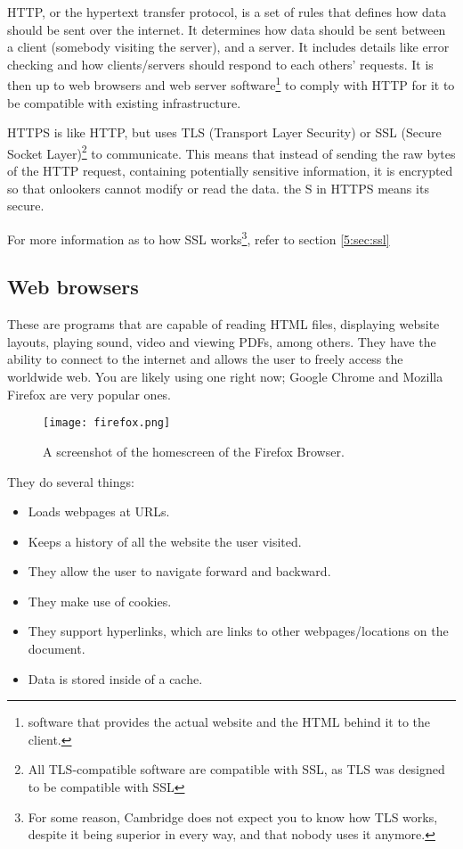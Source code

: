 \documentclass[../main.tex]{subfiles}
\begin{document}
HTTP, or the hypertext transfer protocol, is a set of rules that defines how data should be sent over the internet. It determines how data should be sent between a client (somebody visiting the server), and a server. It includes details like error checking and how clients/servers should respond to each others' requests. It is then up to web browsers and web server software\footnote{software that provides the actual website and the HTML behind it to the client.} to comply with HTTP for it to be compatible with existing infrastructure.

HTTPS is like HTTP, but uses TLS (Transport Layer Security) or SSL (Secure Socket Layer)\footnote{All TLS-compatible software are compatible with SSL, as TLS was designed to be compatible with SSL} to communicate. This means that instead of sending the raw bytes of the HTTP request, containing potentially sensitive information, it is encrypted so that onlookers cannot modify or read the data. the S in HTTPS means its secure.

For more information as to how SSL works\footnote{For some reason, Cambridge does not expect you to know how TLS works, despite it being superior in every way, and that nobody uses it anymore.}, refer to section \ref{5:sec:ssl}

\subsection{Web browsers}

These are programs that are capable of reading HTML files, displaying website layouts, playing sound, video and viewing PDFs, among others. They have the ability to connect to the internet and allows the user to freely access the worldwide web. You are likely using one right now; Google Chrome and Mozilla Firefox are very popular ones.

\begin{figure}[H]
    \centering
    \texttt{[image: firefox.png]}
    \caption{A screenshot of the homescreen of the Firefox Browser.}
    \label{fig:firefox}
\end{figure}

They do several things:

\begin{itemize}
    \item Loads webpages at URLs.
    \item Keeps a history of all the website the user visited.
    \item They allow the user to navigate forward and backward.
    \item They make use of cookies.
    \item They support hyperlinks, which are links to other webpages/locations on the document.
    \item Data is stored inside of a cache.
\end{itemize}
\end{document}
